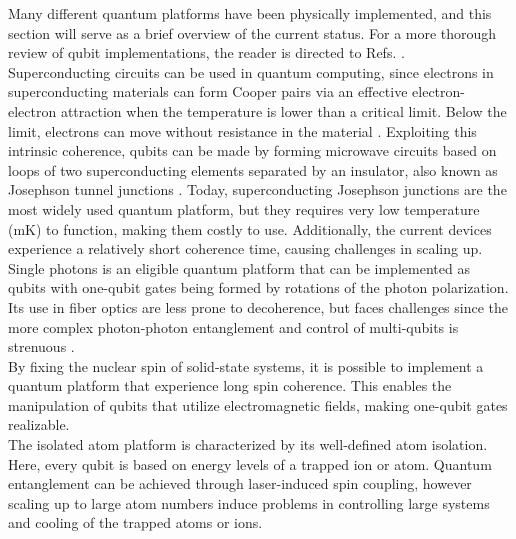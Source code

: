 
Many different quantum platforms have been physically implemented, and this section will serve as a brief overview of the current status. For a more thorough review of qubit implementations, the reader is directed to Refs. \cite{Ladd2010, Acin2018}. \\

Superconducting circuits can be used in quantum computing, since electrons in superconducting materials can form Cooper pairs via an effective electron-electron attraction when the temperature is lower than a critical limit. Below the limit, electrons can move without resistance in the material \cite{KristianFossheim2004}. Exploiting this intrinsic coherence, qubits can be made by forming microwave circuits based on loops of two superconducting elements separated by an insulator, also known as Josephson tunnel junctions \cite{Acin2018}. Today, superconducting Josephson junctions are the most widely used quantum platform, but they requires very low temperature (mK) to function, making them costly to use. Additionally, the current devices experience a relatively short coherence time, causing challenges in scaling up. \\

Single photons is an eligible quantum platform that can be implemented as qubits with one-qubit gates being formed by rotations of the photon polarization. Its use in fiber optics are less prone to decoherence, but faces challenges since the more complex photon-photon entanglement and control of multi-qubits is strenuous \cite{Ladd2010}. \\

By fixing the nuclear spin of solid-state systems, it is possible to implement a quantum platform that experience long spin coherence. This enables the manipulation of qubits that utilize electromagnetic fields, making one-qubit gates realizable. \\

The isolated atom platform is characterized by its well-defined atom isolation. Here, every qubit is based on energy levels of a trapped ion or atom. Quantum entanglement can be achieved through laser-induced spin coupling, however scaling up to large atom numbers induce problems in controlling large systems and cooling of the trapped atoms or ions. \\

